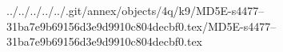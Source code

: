 ../../../../../.git/annex/objects/4q/k9/MD5E-s4477--31ba7e9b69156d3e9d9910c804decbf0.tex/MD5E-s4477--31ba7e9b69156d3e9d9910c804decbf0.tex